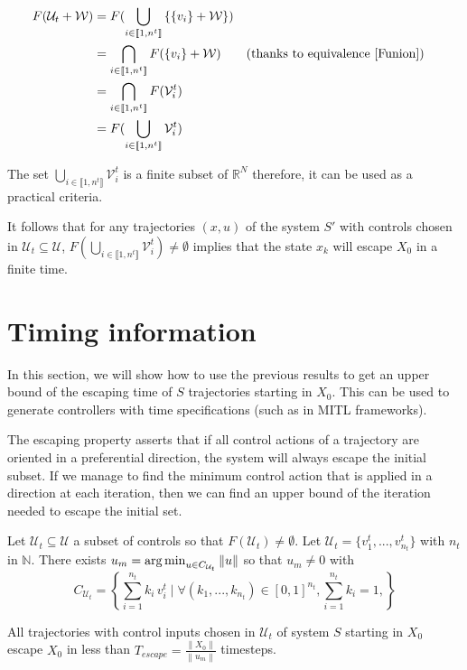 \begin{align*}
F(\mathcal{U}_t + \mathcal{W}) &= F(\bigcup_{i\in \llbracket 1,n^t \rrbracket} \left \{ \left \{ v_i \right \} + \mathcal{W} \right \} ) \\
&= \bigcap_{i\in \llbracket 1,n^t \rrbracket} F(\left \{ v_i \right \} + \mathcal{W}) && \text{(thanks to equivalence \ref{Funion})}\\
&= \bigcap_{i\in \llbracket 1,n^t \rrbracket} F(\mathcal{V}^t_i) \\
&= F( \bigcup_{i\in \llbracket 1,n^t \rrbracket} \mathcal{V}^t_i) \\
\end{align*}

The set $\bigcup_{i\in \llbracket 1,n^t \rrbracket} \mathcal{V}^t_i$ is a finite subset of $\mathbb{R}^N$ therefore, it can be used as a practical criteria.

It follows that for any trajectories $(x,u)$ of the system $S'$ with controls chosen in $\mathcal{U}_t \subseteq \mathcal{U}$, $F( \bigcup_{i\in \llbracket 1,n^t \rrbracket} \mathcal{V}^t_i) \neq \emptyset$ implies that the state $x_k$ will escape $X_0$ in a finite time.


\section{Timing  information}\label{sec_timing}
In this section, we will show how to use the previous results to get an upper bound of the escaping time of $S$ trajectories starting in $X_0$.
This can be used to generate controllers with time specifications (such as in MITL frameworks).

The escaping property asserts that if all control actions of a trajectory are oriented in a preferential direction, the system will always escape the initial subset.
If we manage to find the minimum control action that is applied in a direction at each iteration, then we can find an upper bound of the iteration needed to escape the initial set.

\begin{property}
Let $\mathcal{U}_t \subseteq \mathcal{U}$ a subset of controls so that $F(\mathcal{U}_t) \neq \emptyset$. Let $\mathcal{U}_t = \{v_1^t,...,v_{n_t}^t\}$ with $n_t$ in $\mathbb{N}$.
There exists 
$ u_m = \operatorname*{arg\,min}_{u \in C_{\mathcal{U}_t}} \left \| u \right \|$ so that $u_m \neq 0$ with
\begin{equation}
C_{\mathcal{U}_t}=
\left \{
\sum_{i=1}^{n_t} k_i \, v^t_i
\mid 
\forall (k_1,...,k_{n_t}) \in [0,1]^{n_t},
\sum_{i=1}^{n_t} k_i = 1,
\right \}
\end{equation}



All trajectories with control inputs chosen in $\mathcal{U}_t$  of system $S$ starting in $X_0$ escape $X_0$ in less than $T_{escape} =\frac{\left \| X_0 \right \|}{\left \| u_m \right \|}$ timesteps.
\end{property}

